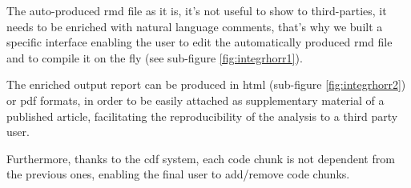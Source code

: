 The auto-produced \gls{rmd} file as it is, it's not useful to show to third-parties, it needs to be enriched with natural language comments,  that's why we built a specific interface enabling the user to edit the automatically produced \gls{rmd} file and to compile it on the fly (see sub-figure \ref{fig:integrhorr1}).

The enriched output report can be produced in \gls{html} (sub-figure \ref{fig:integrhorr2}) or \gls{pdf} formats, in order to be easily attached as supplementary material of a published article, facilitating the reproducibility of the analysis to a third party user.

Furthermore, thanks to the \gls{cdf} system, each code chunk is not dependent from the previous ones, enabling the final user to add/remove code chunks.